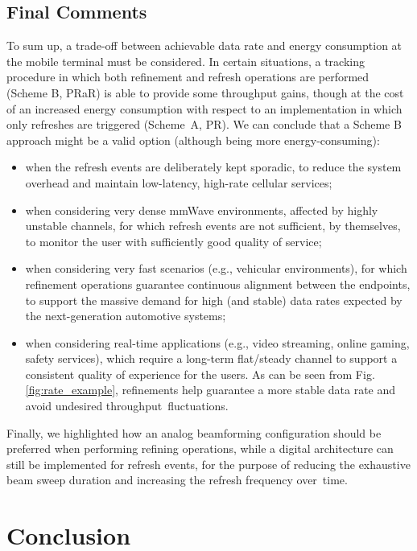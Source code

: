 \documentclass[conference]{IEEEtran}
\begin{document}
\subsection{Final Comments}
To sum up, a trade-off between achievable data rate and energy consumption at the mobile terminal must be considered.
In certain situations, a tracking procedure in which both refinement and refresh operations are performed (Scheme B, PRaR) is able to provide some throughput gains, though at the cost of an increased energy consumption with respect to an implementation in which only refreshes are triggered (Scheme~A, PR).
We can conclude that a Scheme B approach might be a valid option (although being more energy-consuming):
\begin{itemize}
\item when the refresh events are deliberately kept sporadic, to reduce the system overhead and maintain low-latency, high-rate cellular services;
\item when considering  very dense mmWave environments, affected by highly unstable channels, for which refresh events are not sufficient, by themselves, to monitor the user with sufficiently good quality of service;
\item when considering very fast scenarios (e.g., vehicular environments), 
for which refinement operations guarantee continuous alignment between the endpoints, to support the massive demand for high (and stable) data rates expected by the next-generation automotive systems;
\item when considering real-time applications (e.g., video streaming, online gaming, safety  services), which require a
long-term flat/steady channel to support a
consistent quality of experience for the users. As can be seen from Fig. \ref{fig:rate_example}, refinements help guarantee a more stable data rate and avoid undesired throughput~fluctuations.\end{itemize}

Finally, we highlighted how an analog beamforming configuration should be preferred when performing refining operations, while a digital architecture can still be implemented for refresh events,  for the purpose of reducing the exhaustive beam  sweep duration and increasing the refresh frequency over~time.



\section{Conclusion}
\label{sec:conclusion}
\end{document}
